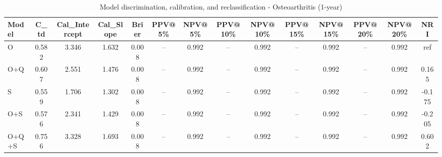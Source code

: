 \begin{table}[htbp]
\centering
\small
\caption{Model discrimination, calibration, and reclassification - Osteoarthritis (1-year)}
\label{tab:perf_osteoarthritis_1y}
\begin{tabular}{lccccccccccccc}
\toprule
Model & C\_td & Cal\_Intercept & Cal\_Slope & Brier & PPV@5\% & NPV@5\% & PPV@10\% & NPV@10\% & PPV@15\% & NPV@15\% & PPV@20\% & NPV@20\% & NRI \\
\midrule
O & 0.582 & 3.346 & 1.632 & 0.008 & -- & 0.992 & -- & 0.992 & -- & 0.992 & -- & 0.992 & ref \\
O+Q & 0.607 & 2.551 & 1.476 & 0.008 & -- & 0.992 & -- & 0.992 & -- & 0.992 & -- & 0.992 & 0.165 \\
S & 0.559 & 1.706 & 1.302 & 0.008 & -- & 0.992 & -- & 0.992 & -- & 0.992 & -- & 0.992 & -0.175 \\
O+S & 0.576 & 2.341 & 1.429 & 0.008 & -- & 0.992 & -- & 0.992 & -- & 0.992 & -- & 0.992 & -0.205 \\
O+Q+S & 0.756 & 3.328 & 1.693 & 0.008 & -- & 0.992 & -- & 0.992 & -- & 0.992 & -- & 0.992 & 0.602 \\
\bottomrule
\end{tabular}
\end{table}